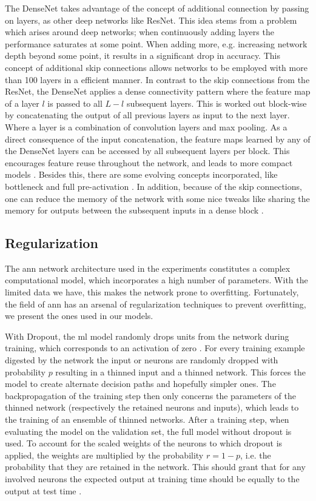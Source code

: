 The DenseNet takes advantage of the concept of additional connection by passing on layers, as other deep networks like ResNet. This idea stems from a problem which arises around deep networks; when continuously adding layers the performance saturates at some point. When adding more, e.g. increasing network depth beyond some point, it results in a significant drop in accuracy.
This concept of additional skip connections allows networks to be employed with more than 100 layers in a efficient manner.
In contrast to the skip connections from the ResNet, the DenseNet applies a dense connectivity pattern where the feature map of a layer $l$ is passed to all $L-l$ subsequent layers. This is worked out block-wise by concatenating the output of all previous layers as input to the next layer. Where a layer is a combination of convolution layers and max pooling.
As a direct consequence of the input concatenation, the feature maps learned by any of the
DenseNet layers can be accessed by all subsequent layers per block. This encourages feature reuse throughout the network, and leads to more compact models \cite{Huang2017a}.
Besides this, there are some evolving concepts incorporated, like bottleneck and full pre-activation \cite{He2016a}.
In addition, because of the skip connections, one can reduce the memory of the network with some nice tweaks like sharing the memory for outputs between the subsequent inputs in a dense block \cite{Huang}.


\subsection{Regularization}
The \gls{ann} network architecture used in the experiments constitutes a complex computational model, which incorporates a high number of parameters. With the limited data we have, this makes the network prone to overfitting. Fortunately, the field of \gls{ann} has an arsenal of regularization techniques to prevent overfitting, we present the ones used in our models.

With Dropout, the \gls{ml} model randomly drops units from the network during training, which corresponds to an activation of zero \cite{Srivastava2014Dropout:Overfitting}. For every training example digested by the network the input or neurons are randomly dropped with probability $p$ resulting in a thinned input and a thinned network. This forces the model to create alternate decision paths and hopefully simpler ones. The backpropagation of the training step then only concerns the parameters of the thinned network (respectively the retained neurons and inputs), which leads to the training of an ensemble of thinned networks. After a training step, when evaluating the model on the validation set, the full model without dropout is used. To account for the scaled weights of the neurons to which dropout is applied, the weights are multiplied by the probability $r=1-p$, i.e. the probability that they are retained in the network. This should grant that for any involved neurons the expected output at training time should be equally to the output at test time \cite{Srivastava2014Dropout:Overfitting}.

